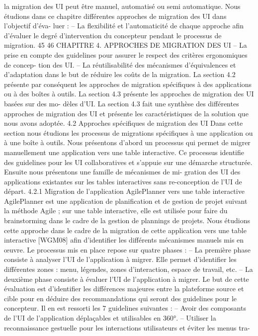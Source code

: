 \documentclass{article}
\begin{document}
la migration des UI peut être manuel, automatisé ou semi automatique.
Nous étudions dans ce chapitre différentes approches de migration des UI dans l’objectif d’éva-
luer :
– La ﬂexibilité et l’automaticité de chaque approche aﬁn d’évaluer le degré d’intervention du
concepteur pendant le processus de migration.
45
46
CHAPITRE 4. APPROCHES DE MIGRATION DES UI
– La prise en compte des guidelines pour assurer le respect des critères ergonomiques de concep-
tion des UI.
– La réutilisabilité des mécanismes d’équivalences et d’adaptation dans le but de réduire les
coûts de la migration.
La section 4.2 présente par conséquent les approches de migration spéciﬁques à des applications
ou à des boîtes à outils. La section 4.3 présente les approches de migration des UI basées sur des mo-
dèles d’UI. La section 4.3 fait une synthèse des différentes approches de migration des UI et présente
les caractéristiques de la solution que nous avons adoptée.
4.2
Approches spéciﬁques de migration des UI
Dans cette section nous étudions les processus de migrations spéciﬁques à une application ou à
une boîte à outils. Nous présentons d’abord un processus qui permet de migrer manuellement une
application vers une table interactive. Ce processus identiﬁe des guidelines pour les UI collaboratives
et s’appuie sur une démarche structurée. Ensuite nous présentons une famille de mécanismes de mi-
gration des UI des applications existantes sur les tables interactives sans re-conception de l’UI de
départ.
4.2.1
Migration de l’application AgilePlanner vers une table interactive
AgilePlanner est une application de planiﬁcation et de gestion de projet suivant la méthode Agile ;
sur une table interactive, elle est utilisée pour faire du brainstorming dans le cadre de la gestion de
plannings de projets. Nous étudions cette approche dans le cadre de la migration de cette application
vers une table interactive [WGM08] aﬁn d’identiﬁer les différents mécanismes manuels mis en œuvre.
Le processus mis en place repose sur quatre phases :
– La première phase consiste à analyser l’UI de l’application à migrer. Elle permet d’identiﬁer
les différentes zones : menu, légendes, zones d’interaction, espace de travail, etc.
– La deuxième phase consiste à évaluer l’UI de l’application à migrer. Le but de cette évaluation
est d’identiﬁer les différences majeures entre la plateforme source et cible pour en déduire des
recommandations qui seront des guidelines pour le concepteur. Il en est ressorti les 7 guidelines
suivantes :
– Avoir des composants de l’UI de l’application déplaçables et utilisables en 360°.
– Utiliser la reconnaissance gestuelle pour les interactions utilisateurs et éviter les menus tra-
\end{document}
